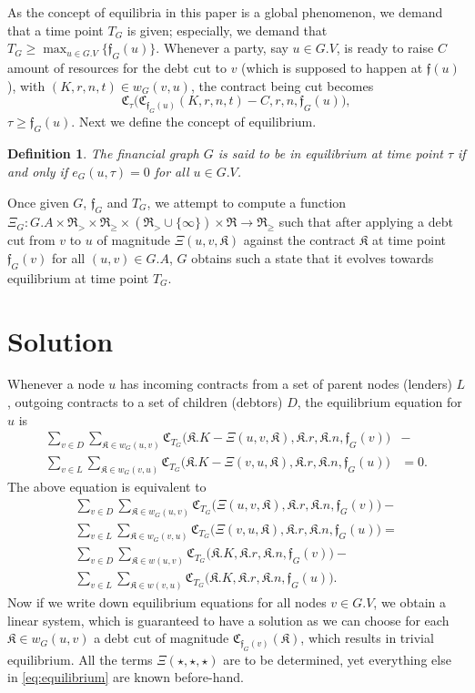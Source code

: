 \documentclass[10pt]{article}
\newcommand{\RR}{\mathfrak{R}}
\newcommand{\KK}{\mathfrak{K}}
\newcommand{\CC}{\mathfrak{C}}
\newcommand{\ff}{\mathfrak{f}}
\newtheorem{mydef}{Definition}
\begin{document}
As the concept of equilibria in this paper is a global phenomenon, we demand that a time point $T_G$ is given; especially, we demand that $T_G \geq \max_{u \in G.V} \{ \ff_G(u) \}$. Whenever a party, say $u \in G.V$, is ready to raise $C$ amount of resources for the debt cut to $v$ (which is supposed to happen at $\ff(u)$), with $(K, r, n, t) \in w_G(v, u)$, the contract being cut becomes 
\[
\CC_{\tau}\big(\CC_{\ff_G(u)}(K, r, n, t) - C, r, n, \ff_G(u) \big),
\]
$\tau \geq \ff_G(u)$.
 Next we define the concept of equilibrium.
\begin{mydef}
The financial graph $G$ is said to be in equilibrium at time point $\tau$ if and only if $e_G(u,\tau) = 0$ for all $u \in G.V$.
\end{mydef}
Once given $G$, $\ff_G$ and $T_G$, we attempt to compute a function $\Xi_G \colon G.A \times \RR_> \times \RR_{\geq} \times (\RR_> \cup \{ \infty \}) \times \RR \to \RR_{\geq}$ such that after applying a debt cut from $v$ to $u$ of magnitude $\Xi(u, v, \KK)$ against the contract $\KK$ at time point $\ff_G(v)$ for  all $(u, v) \in G.A$, $G$ obtains such a state that it evolves towards equilibrium at time point $T_G$.

\section{Solution}
Whenever a node $u$ has incoming contracts from a set of parent nodes (lenders) $L$, outgoing contracts to a set of children (debtors) $D$, the equilibrium equation for $u$ is
\begin{equation*}
\begin{aligned}
\sum_{v \in D} \sum_{\KK \in w_G(u, v)} \CC_{T_G} \big( \KK.K - \Xi(u, v, \KK), \KK.r, \KK.n, \ff_G(v) \big ) & - \\ 
\sum_{v \in L} \sum_{\KK \in w_G(v, u)} \CC_{T_G} \big( \KK.K - \Xi(v, u, \KK), \KK.r, \KK.n, \ff_G(u) \big) & = 0.
\end{aligned}
\end{equation*}
The above equation is equivalent to
\begin{equation}
\label{eq:equilibrium}
\begin{aligned}
& \sum_{v \in D} \sum_{\KK \in w_G(u, v)} \CC_{T_G} \big( \Xi(u, v, \KK), \KK.r, \KK.n, \ff_G(v) \big) - \\
& \sum_{v \in L} \sum_{\KK \in w_G(v, u)} \CC_{T_G} \big( \Xi(v, u, \KK), \KK.r, \KK.n, \ff_G(u) \big) = \\
& \sum_{v \in D} \sum_{\KK \in w(u, v)} \CC_{T_G} \big( \KK.K, \KK.r, \KK.n, \ff_G(v) \big) - \\
& \sum_{v \in L} \sum_{\KK \in w(v, u)} \CC_{T_G} \big( \KK.K, \KK.r, \KK.n, \ff_G(u) \big). &
\end{aligned}
\end{equation}
Now if we write down equilibrium equations for all nodes $v \in G.V$, we obtain a linear system, which is guaranteed to have a solution as we can choose for each $\KK \in w_G(u, v)$ a debt cut of magnitude $\CC_{\ff_G(v)}(\KK)$, which results in trivial equilibrium. All the terms $\Xi(\star, \star, \star)$ are to be determined, yet everything else in \eqref{eq:equilibrium} are known before-hand. 
\end{document}
